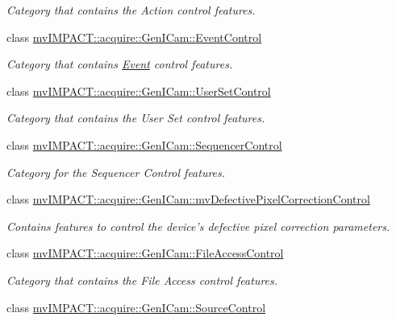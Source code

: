 \begin{DoxyCompactItemize}
\begin{DoxyCompactList}\small\item\em Category that contains the Action control features. \end{DoxyCompactList}\item 
class \hyperlink{classmv_i_m_p_a_c_t_1_1acquire_1_1_gen_i_cam_1_1_event_control}{mv\+I\+M\+P\+A\+C\+T\+::acquire\+::\+Gen\+I\+Cam\+::\+Event\+Control}
\begin{DoxyCompactList}\small\item\em Category that contains \hyperlink{classmv_i_m_p_a_c_t_1_1acquire_1_1_event}{Event} control features. \end{DoxyCompactList}\item 
class \hyperlink{classmv_i_m_p_a_c_t_1_1acquire_1_1_gen_i_cam_1_1_user_set_control}{mv\+I\+M\+P\+A\+C\+T\+::acquire\+::\+Gen\+I\+Cam\+::\+User\+Set\+Control}
\begin{DoxyCompactList}\small\item\em Category that contains the User Set control features. \end{DoxyCompactList}\item 
class \hyperlink{classmv_i_m_p_a_c_t_1_1acquire_1_1_gen_i_cam_1_1_sequencer_control}{mv\+I\+M\+P\+A\+C\+T\+::acquire\+::\+Gen\+I\+Cam\+::\+Sequencer\+Control}
\begin{DoxyCompactList}\small\item\em Category for the Sequencer Control features. \end{DoxyCompactList}\item 
class \hyperlink{classmv_i_m_p_a_c_t_1_1acquire_1_1_gen_i_cam_1_1mv_defective_pixel_correction_control}{mv\+I\+M\+P\+A\+C\+T\+::acquire\+::\+Gen\+I\+Cam\+::mv\+Defective\+Pixel\+Correction\+Control}
\begin{DoxyCompactList}\small\item\em Contains features to control the device's defective pixel correction parameters. \end{DoxyCompactList}\item 
class \hyperlink{classmv_i_m_p_a_c_t_1_1acquire_1_1_gen_i_cam_1_1_file_access_control}{mv\+I\+M\+P\+A\+C\+T\+::acquire\+::\+Gen\+I\+Cam\+::\+File\+Access\+Control}
\begin{DoxyCompactList}\small\item\em Category that contains the File Access control features. \end{DoxyCompactList}\item 
class \hyperlink{classmv_i_m_p_a_c_t_1_1acquire_1_1_gen_i_cam_1_1_source_control}{mv\+I\+M\+P\+A\+C\+T\+::acquire\+::\+Gen\+I\+Cam\+::\+Source\+Control}

\end{DoxyCompactItemize}
